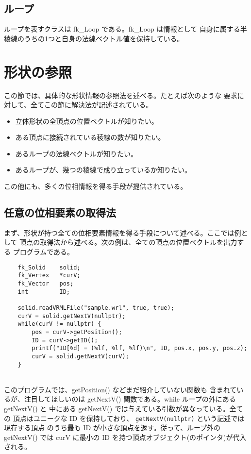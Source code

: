 \subsection{ループ}
ループを表すクラスは fk\_Loop である。fk\_Loop は情報として
自身に属する半稜線のうちの1つと自身の法線ベクトル値を保持している。

\section{形状の参照}
この節では、具体的な形状情報の参照法を述べる。たとえば次のような
要求に対して、全てこの節に解決法が記述されている。
\begin{itemize}
 \item 立体形状の全頂点の位置ベクトルが知りたい。
 \item ある頂点に接続されている稜線の数が知りたい。
 \item あるループの法線ベクトルが知りたい。
 \item あるループが、幾つの稜線で成り立っているか知りたい。
\end{itemize}
この他にも、多くの位相情報を得る手段が提供されている。

\subsection{任意の位相要素の取得法}
まず、形状が持つ全ての位相要素情報を得る手段について述べる。ここでは例として
頂点の取得法から述べる。次の例は、全ての頂点の位置ベクトルを出力する
プログラムである。
\\
\begin{breakbox}
\begin{verbatim}
    fk_Solid    solid;
    fk_Vertex   *curV;
    fk_Vector   pos;
    int         ID;

    solid.readVRMLFile("sample.wrl", true, true);
    curV = solid.getNextV(nullptr);
    while(curV != nullptr) {
        pos = curV->getPosition();
        ID = curV->getID();
        printf("ID[%d] = (%lf, %lf, %lf)\n", ID, pos.x, pos.y, pos.z);
        curV = solid.getNextV(curV);
    }
\end{verbatim}
\end{breakbox}
~ \\
このプログラムでは、getPosition() などまだ紹介していない関数も
含まれているが、注目してほしいのは
getNextV() 関数である。while ループの外にある getNextV() と
中にある getNextV() では与えている引数が異なっている。全ての
頂点はユニークな ID を保持しており、
\verb+getNextV(nullptr)+ という記述では現存する頂点
のうち最も ID が小さな頂点を返す。従って、ループ外の getNextV() では
curV に最小の ID を持つ頂点オブジェクト(のポインタ)が代入される。

